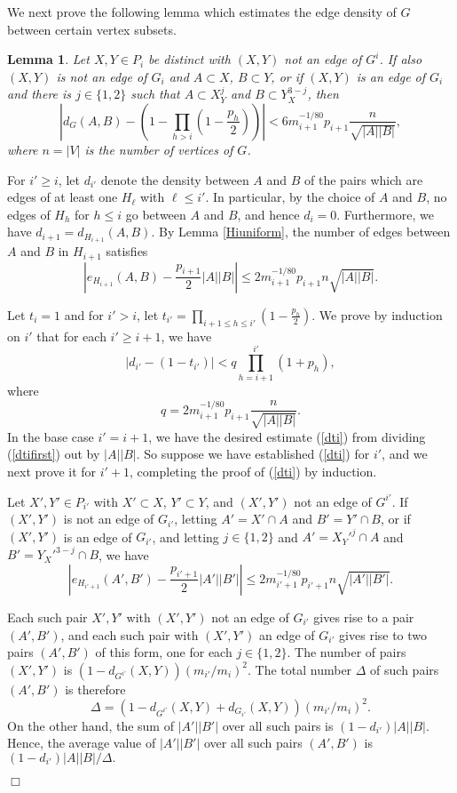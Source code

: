 \documentclass[11pt]{article}
\newtheorem{lemma}{Lemma}[section]
\newenvironment{proof}
      {\medskip\noindent{\bf Proof:}\hspace{1mm}}
      {\hfill$\Box$\medskip}
\begin{document}
We next prove the following lemma which estimates the edge density of $G$
between certain vertex subsets.

\begin{lemma} \label{xyab}
Let $X,Y \in P_i$ be distinct with $(X,Y)$ not an edge of $G^i$. If also
$(X,Y)$ is not an edge of $G_i$ and $A \subset X$, $B \subset Y$, or if $(X,Y)$
is an edge of $G_i$ and there is $j \in \{1,2\}$ such that $A \subset X_Y^j$
and $B \subset Y_X^{3-j}$, then $$\left|d_G(A,B)-\left(1-\prod_{h >
i}\left(1-\frac{p_h}{2}\right)\right)\right|<6m_{i+1}^{-1/80}p_{i+1}\frac{n}{\sqrt{|A||B|}},$$
where $n=|V|$ is the number of vertices of $G$.
\end{lemma}
\begin{proof}
For $i' \geq i$, let $d_{i'}$ denote the density between $A$ and $B$ of the
pairs which are edges of at least one $H_{\ell}$ with $\ell \leq i'$. In
particular, by the choice of $A$ and $B$, no edges of $H_h$ for $h \leq i$ go
between $A$ and $B$, and hence $d_i=0$. Furthermore, we have
$d_{i+1}=d_{H_{i+1}}(A,B)$. By Lemma \ref{Hiuniform}, the number of edges
between $A$ and $B$ in $H_{i+1}$ satisfies
\begin{equation}\label{dtifirst}\left|e_{H_{i+1}}(A,B)-\frac{p_{i+1}}{2}|A||B|\right|\leq
2m_{i+1}^{-1/80}p_{i+1}n\sqrt{|A||B|}.\end{equation}

 Let $t_{i}=1$ and for $i'>i$, let
$t_{i'}=\prod_{i + 1 \leq h \leq i'}\left(1-\frac{p_h}{2}\right)$. We prove by
induction on $i'$ that for each $i' \geq i+1$, we have
\begin{equation}\label{dti}
| d_{i'}-(1-t_{i'})|<q\prod_{h=i+1}^ {i'}(1+p_h),
\end{equation}
where $$q=2m_{i+1}^{-1/80}p_{i+1}\frac{n}{\sqrt{|A||B|}}.$$
In the base case $i'=i+1$, we have the desired estimate (\ref{dti}) from dividing
(\ref{dtifirst}) out by $|A||B|$. So suppose we have established (\ref{dti})
for $i'$, and we next prove it for $i'+1$, completing the proof of (\ref{dti})
by induction.

Let $X',Y' \in P_{i'}$ with $X' \subset X$, $Y' \subset Y$, and $(X',Y')$ not
an edge of $G^{i'}$. If $(X',Y')$ is not an edge of $G_{i'}$, letting $A'=X'
\cap A$ and $B'=Y' \cap B$, or if $(X',Y')$ is an edge of $G_{i'}$, and letting
$j \in \{1,2\}$ and $A'=X_Y'^j \cap A$ and $B'=Y_X'^{3-j} \cap B$, we have
$$\left|e_{H_{i'+1}}(A',B')-\frac{p_{i'+1}}{2}|A'||B'|\right| \leq
2m_{i'+1}^{-1/80}p_{i'+1}n\sqrt{|A'||B'|}.$$

Each such pair $X',Y'$ with $(X',Y')$ not an edge of $G_{i'}$ gives rise to a
pair $(A',B')$, and each such pair with $(X',Y')$ an edge of $G_{i'}$ gives
rise to two pairs $(A',B')$ of this form, one for each $j \in \{1,2\}$. The
number of pairs $(X',Y')$ is
$\left(1-d_{G^{i'}}(X,Y)\right)\left(m_{i'}/m_i\right)^2$. The total number
$\Delta$ of such pairs $(A',B')$ is therefore
$$\Delta=\left(1-d_{G^{i'}}(X,Y)+d_{G_{i'}}(X,Y)\right)(m_{i'}/m_i)^2.$$ On the
other hand, the sum of $|A'||B'|$ over all such pairs is $(1-d_{i'})|A||B|$.
Hence, the average value of $|A'||B'|$ over all such pairs $(A',B')$ is
$(1-d_{i'})|A||B|/\Delta.$


\end{proof}
\end{document}
